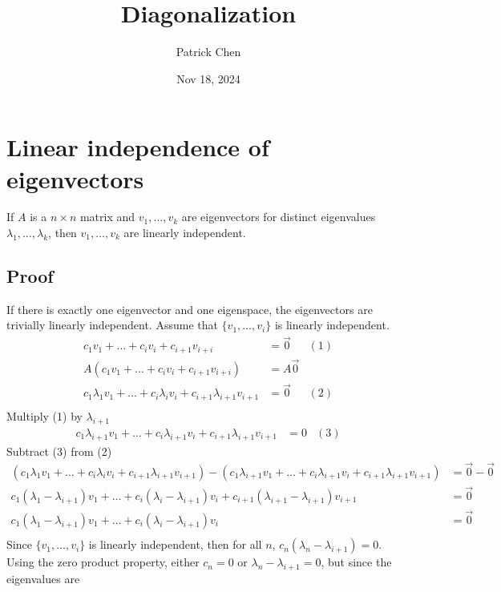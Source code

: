 \documentclass{article}
\title{Diagonalization}
\author{Patrick Chen}
\date{Nov 18, 2024}
\theoremstyle{mytheoremstyle}
\theoremstyle{mytheoremstyle}
\theoremstyle{myproblemstyle}
\begin{document}
    \maketitle
    \section*{Linear independence of eigenvectors}
    If $A$ is a $n\times n$ matrix and $v_1,\dots,v_k$ are eigenvectors for distinct
    eigenvalues $\lambda_1,\dots,\lambda_k$, then $v_1,\dots,v_k$ are linearly
    independent.

    \subsection*{Proof}
    If there is exactly one eigenvector and one eigenspace, the eigenvectors are
    trivially linearly independent. Assume that $\{v_1,\dots,v_i\}$ is linearly
    independent.
    \begin{align*}
        c_1v_1 + \dots + c_iv_i + c_{i+1}v_{i+i} &= \vec{0} & (1)\\
        A(c_1v_1 + \dots + c_iv_i + c_{i+1}v_{i+i}) &= A \vec{0} \\
        c_1\lambda_1v_1 + \dots + c_i\lambda_iv_i + c_{i+1}\lambda_{i+1}v_{i+1} &= \vec{0} & (2) \\
    \end{align*}
    Multiply (1) by $\lambda_{i+1}$
    \begin{align*}
        c_1\lambda_{i+1}v_1 + \dots + c_i\lambda_{i+1}v_i + c_{i+1}\lambda_{i+1}v_{i+1} &= 0 & (3)
    \end{align*}
    Subtract (3) from (2)
    \begin{align*}
        (c_1\lambda_1v_1 + \dots + c_i\lambda_iv_i + c_{i+1}\lambda_{i+1}v_{i+1}) -
        (c_1\lambda_{i+1}v_1 + \dots + c_i\lambda_{i+1}v_i + c_{i+1}\lambda_{i+1}v_{i+1})
        &= \vec{0} - \vec{0} \\
        c_1(\lambda_1-\lambda_{i+1})v_1 + \dots +
        c_i(\lambda_i-\lambda_{i+1})v_i +
        c_{i+1}(\lambda_{i+1}-\lambda_{i+1})v_{i+1} &= \vec{0} \\
        c_1(\lambda_1-\lambda_{i+1})v_1 + \dots +
        c_i(\lambda_i-\lambda_{i+1})v_i &= \vec{0} \\
    \end{align*}
    Since $\{v_1,\dots,v_i\}$ is linearly independent, then for all $n$,
    $c_n(\lambda_n-\lambda_{i+1}) = 0$. Using the zero product property, either
    $c_n=0$ or $\lambda_n-\lambda_{i+1}=0$, but since the eigenvalues are
\end{document}
